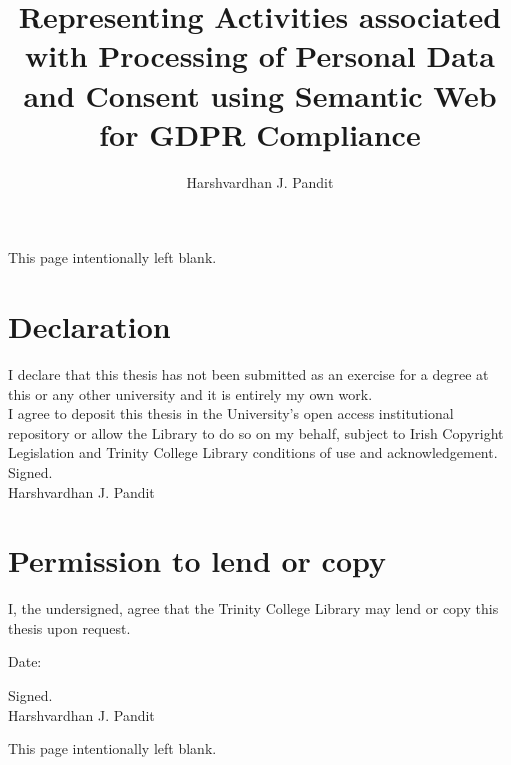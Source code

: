\documentclass[a4paper,oneside,11pt]{book}
\title{Representing Activities associated with Processing of Personal Data and Consent using Semantic Web for GDPR Compliance}
\author{Harshvardhan J. Pandit}
\makeatletter
\def\cleardoublepage{\clearpage%
        \if@twoside
            \ifodd\c@page\else
                \vspace*{\fill}
                \hfill
                \begin{center}
                This page intentionally left blank.
                \end{center}
                \vspace{\fill}
                \thispagestyle{empty}
                \newpage
                \if@twocolumn\hbox{}\newpage\fi
            \fi
        \fi
    }
\makeatother
\begin{document}

{}


\cleardoublepage

\chapter*{Declaration}
I declare that this thesis has not been submitted as an exercise for a degree at this or any other university and it is entirely my own work. \\[1cm]
\noindent I agree to deposit this thesis in the University’s open access institutional repository or allow the Library to do so on my behalf, subject to Irish Copyright Legislation and Trinity College Library conditions of use and acknowledgement. \\[3cm]
Signed. \\
Harshvardhan J. Pandit

\chapter*{Permission to lend or copy}
I, the undersigned, agree that the Trinity College Library may lend or copy this thesis upon request.

\vspace{3cm}\noindent
Date:

\vspace{1cm}\noindent
Signed. \\
Harshvardhan J. Pandit




\cleardoublepage
\pagestyle{plain}
\tableofcontents
\listoffigures
\listoftables
\renewcommand\listoflistingscaption{List of source codes}
\listoflistings


\mainmatter
\renewcommand{\thepage}{\arabic{page}}
\setcounter{page}{1}
\linenumbers \rightlinenumbers*










\end{document}
